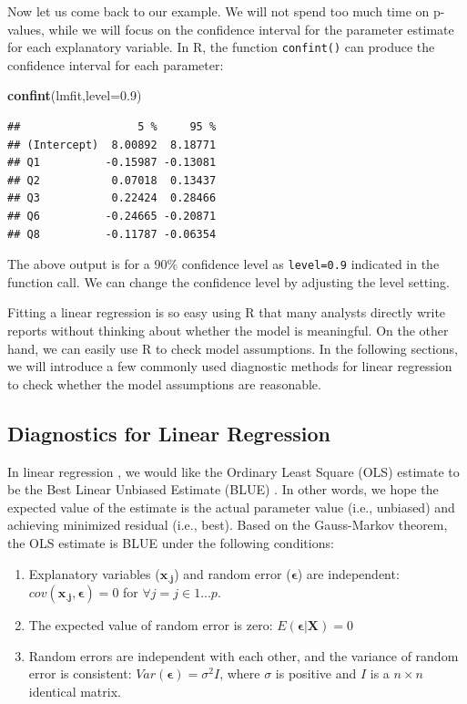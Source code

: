 \documentclass[12pt,]{krantz}
\makeatletter
\newenvironment{Shaded}{\begin{snugshade}}{\end{snugshade}}
\newcommand{\DataTypeTok}[1]{\textcolor[rgb]{0.27,0.27,0.27}{#1}}
\newcommand{\FloatTok}[1]{\textcolor[rgb]{0.06,0.06,0.06}{#1}}
\newcommand{\KeywordTok}[1]{\textcolor[rgb]{0.27,0.27,0.27}{\textbf{#1}}}
\newcommand{\NormalTok}[1]{#1}
\newenvironment{kframe}{%
\medskip{}
\setlength{\fboxsep}{.8em}
 \def\at@end@of@kframe{}%
 \ifinner\ifhmode%
  \def\at@end@of@kframe{\end{minipage}}%
  \begin{minipage}{\columnwidth}%
 \fi\fi%
 \def\FrameCommand##1{\hskip\@totalleftmargin \hskip-\fboxsep
 \colorbox{shadecolor}{##1}\hskip-\fboxsep
     \hskip-\linewidth \hskip-\@totalleftmargin \hskip\columnwidth}%
 \MakeFramed {\advance\hsize-\width
   \@totalleftmargin\z@ \linewidth\hsize
   \@setminipage}}%
 {\par\unskip\endMakeFramed%
 \at@end@of@kframe}
\renewenvironment{Shaded}{\begin{kframe}}{\end{kframe}}
\makeatother
\begin{document}
Now let us come back to our example. We will not spend too much time on p-values, while we will focus on the confidence interval for the parameter estimate for each explanatory variable. In R, the function \texttt{confint()} can produce the confidence interval for each parameter:

\begin{Shaded}
\begin{Highlighting}[]
\KeywordTok{confint}\NormalTok{(lmfit,}\DataTypeTok{level=}\FloatTok{0.9}\NormalTok{)}
\end{Highlighting}
\end{Shaded}

\begin{verbatim}
##                  5 %     95 %
## (Intercept)  8.00892  8.18771
## Q1          -0.15987 -0.13081
## Q2           0.07018  0.13437
## Q3           0.22424  0.28466
## Q6          -0.24665 -0.20871
## Q8          -0.11787 -0.06354
\end{verbatim}

The above output is for a 90\% confidence level as \texttt{level=0.9} indicated in the function call. We can change the confidence level by adjusting the level setting.

Fitting a linear regression is so easy using R that many analysts directly write reports without thinking about whether the model is meaningful. On the other hand, we can easily use R to check model assumptions. In the following sections, we will introduce a few commonly used diagnostic methods for linear regression to check whether the model assumptions are reasonable.

\hypertarget{diagnostics-for-linear-regression}{%
\subsection{Diagnostics for Linear Regression}\label{diagnostics-for-linear-regression}}

In linear regression , we would like the Ordinary Least Square (OLS)  estimate to be the Best Linear Unbiased Estimate (BLUE) . In other words, we hope the expected value of the estimate is the actual parameter value (i.e., unbiased) and achieving minimized residual (i.e., best). Based on the Gauss-Markov theorem, the OLS  estimate is BLUE  under the following conditions:

\begin{enumerate}
\def\labelenumi{\arabic{enumi}.}
\item
  Explanatory variables (\(\mathbf{x_{.j}}\)) and random error (\(\mathbf{\epsilon}\)) are independent: \(cov(\mathbf{x_{.j},\epsilon})=0\) for \(\forall j=j\in1...p\).
\item
  The expected value of random error is zero: \(E(\mathbf{\epsilon|X})=0\)
\item
  Random errors are independent with each other, and the variance of random error is consistent: \(Var(\mathbf{\epsilon})=\sigma^{2}I\), where \(\sigma\) is positive and \(I\) is a \(n \times n\) identical matrix.
\end{enumerate}
\end{document}

